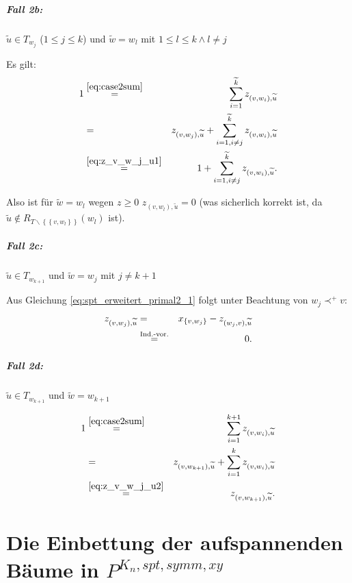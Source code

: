 \documentclass[10p,a4paper,BCOR = 12mm, DIV=15]{scrbook}
\begin{document}
\begin{bew}
\subparagraph{Fall 2b:} $\widetilde{u}\in T_{w_j}$ ($1\leq j \leq k$) und $\widetilde{w} = w_l$ mit $1\leq l \leq k\wedge l\neq j$

Es gilt:
\begin{eqnarray*}
1 & \stackrel{\eqref{eq:case2sum}}{=} & \sum_{i=1}^{\widetilde{k}} z_{\left(v, w_i\right), \widetilde{u}} \\
& = & z_{\left(v, w_j\right), \widetilde{u}} + \sum_{i=1, i\neq j}^{\widetilde{k}} z_{\left(v, w_i\right), \widetilde{u}} \\
& \stackrel{\eqref{eq:z_v_w_j_u1}}{=} & 1 + \sum_{i=1, i\neq j}^{\widetilde{k}} z_{\left(v, w_i\right), \widetilde{u}}.
\end{eqnarray*}

Also ist für $\widetilde{w} = w_l$ wegen $z\geq 0$ $z_{\left(v, w_l\right), \widetilde{u}} = 0$ (was sicherlich korrekt ist, da $\widetilde{u}\notin R_{T\backslash \left\{\left\{v, w_l\right\}\right\}} \left(w_l\right)$ ist).

\subparagraph{Fall 2c:} $\widetilde{u}\in T_{w_{k+1}}$ und $\widetilde{w}=w_j$ mit $j\neq k+1$

Aus Gleichung \eqref{eq:spt_erweitert_primal2_1} folgt unter Beachtung von $w_j \prec^+ v$:
\begin{eqnarray}
z_{\left(v, w_j\right), \widetilde{u}} & = & x_{\left\{v, w_j\right\}} - z_{\left(w_j, v\right), \widetilde{u}} \nonumber \\
& \stackrel{\textnormal{Ind.-vor.}}{=} & 0.  \label{eq:z_v_w_j_u2}
\end{eqnarray}

\subparagraph{Fall 2d:} $\widetilde{u}\in T_{w_{k+1}}$ und $\widetilde{w} = w_{k+1}$

\begin{eqnarray*}
1 & \stackrel{\eqref{eq:case2sum}}{=} & \sum_{i=1}^{k+1} z_{\left(v, w_i\right), \widetilde{u}} \\
& = & z_{\left(v, w_{k+1}\right), \widetilde{u}} + \sum_{i=1}^{k} z_{\left(v, w_i\right), \widetilde{u}} \\
& \stackrel{\eqref{eq:z_v_w_j_u2}}{=} & z_{\left(v, w_{k+1}\right), \widetilde{u}}.
\end{eqnarray*}
\end{bew}

\section{Die Einbettung der aufspannenden Bäume in $P^{K_n, spt, symm, xy}$}
\end{document}
